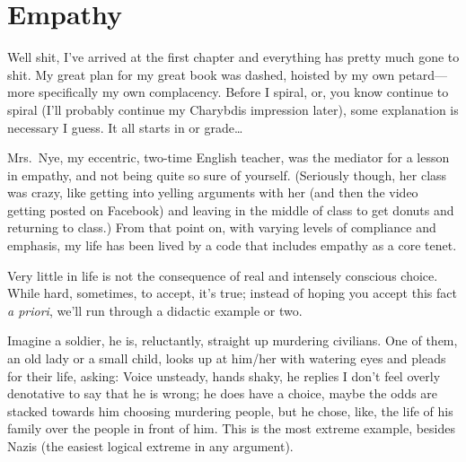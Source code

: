 \documentclass[../butidigress.tex]{subfiles}
\begin{document}
\chapter{Empathy}\label{chap:empathy}
\newpage

Well shit, I've arrived at the first chapter and everything has pretty much gone to shit.
My great plan for my great book was dashed, hoisted by my own petard---more specifically my own complacency.
Before I spiral, or, you know continue to spiral (I'll probably continue my Charybdis impression later), some explanation is necessary I guess.
It all starts in  or  grade\ldots{}

Mrs.~Nye, my eccentric, two-time English teacher, was the mediator for a lesson in empathy, and not being quite so sure of yourself.
(Seriously though, her class was crazy, like getting into yelling arguments with her (and then the video getting posted on Facebook) and leaving in the middle of class to get donuts and returning to class.)
From that point on, with varying levels of compliance and emphasis, my life has been lived by a code that includes empathy as a core tenet.

Very little in life is not the consequence of real and intensely conscious choice.
While hard, sometimes, to accept, it's true; instead of hoping you accept this fact \textit{a priori}, we'll run through a didactic example or two.

Imagine a soldier, he is, reluctantly, straight up murdering civilians.
One of them, an old lady or a small child, looks up at him/her with watering eyes and pleads for their life, asking: 
Voice unsteady, hands shaky, he replies 
I don't feel overly denotative to say that he is wrong; he does have a choice, maybe the odds are stacked towards him choosing murdering people, but he chose, like, the life of his family over the people in front of him.
This is the most extreme example, besides Nazis (the easiest logical extreme in any argument).
\end{document}
